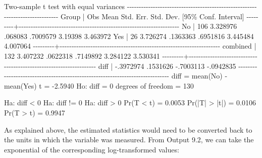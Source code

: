 \documentclass[
]{memoir}
\newenvironment{Shaded}{\begin{snugshade}}{\end{snugshade}}
\newcommand{\NormalTok}[1]{#1}
\begin{document}
\begin{Shaded}
\begin{Highlighting}[]
\NormalTok{Two{-}sample t test with equal variances}
\NormalTok{{-}{-}{-}{-}{-}{-}{-}{-}{-}{-}{-}{-}{-}{-}{-}{-}{-}{-}{-}{-}{-}{-}{-}{-}{-}{-}{-}{-}{-}{-}{-}{-}{-}{-}{-}{-}{-}{-}{-}{-}{-}{-}{-}{-}{-}{-}{-}{-}{-}{-}{-}{-}{-}{-}{-}{-}{-}{-}{-}{-}{-}{-}{-}{-}{-}{-}{-}{-}{-}{-}{-}{-}{-}{-}{-}{-}{-}{-}}
\NormalTok{   Group |     Obs        Mean    Std. Err.   Std. Dev.   [95\% Conf. Interval]}
\NormalTok{{-}{-}{-}{-}{-}{-}{-}{-}{-}+{-}{-}{-}{-}{-}{-}{-}{-}{-}{-}{-}{-}{-}{-}{-}{-}{-}{-}{-}{-}{-}{-}{-}{-}{-}{-}{-}{-}{-}{-}{-}{-}{-}{-}{-}{-}{-}{-}{-}{-}{-}{-}{-}{-}{-}{-}{-}{-}{-}{-}{-}{-}{-}{-}{-}{-}{-}{-}{-}{-}{-}{-}{-}{-}{-}{-}{-}{-}}
\NormalTok{      No |     106    3.328976     .068083    .7009579     3.19398    3.463972}
\NormalTok{     Yes |      26    3.726274    .1363363    .6951816    3.445484    4.007064}
\NormalTok{{-}{-}{-}{-}{-}{-}{-}{-}{-}+{-}{-}{-}{-}{-}{-}{-}{-}{-}{-}{-}{-}{-}{-}{-}{-}{-}{-}{-}{-}{-}{-}{-}{-}{-}{-}{-}{-}{-}{-}{-}{-}{-}{-}{-}{-}{-}{-}{-}{-}{-}{-}{-}{-}{-}{-}{-}{-}{-}{-}{-}{-}{-}{-}{-}{-}{-}{-}{-}{-}{-}{-}{-}{-}{-}{-}{-}{-}}
\NormalTok{combined |     132    3.407232    .0622318    .7149892    3.284122    3.530341}
\NormalTok{{-}{-}{-}{-}{-}{-}{-}{-}{-}+{-}{-}{-}{-}{-}{-}{-}{-}{-}{-}{-}{-}{-}{-}{-}{-}{-}{-}{-}{-}{-}{-}{-}{-}{-}{-}{-}{-}{-}{-}{-}{-}{-}{-}{-}{-}{-}{-}{-}{-}{-}{-}{-}{-}{-}{-}{-}{-}{-}{-}{-}{-}{-}{-}{-}{-}{-}{-}{-}{-}{-}{-}{-}{-}{-}{-}{-}{-}}
\NormalTok{    diff |           {-}.3972974    .1531626               {-}.7003113   {-}.0942835}
\NormalTok{{-}{-}{-}{-}{-}{-}{-}{-}{-}{-}{-}{-}{-}{-}{-}{-}{-}{-}{-}{-}{-}{-}{-}{-}{-}{-}{-}{-}{-}{-}{-}{-}{-}{-}{-}{-}{-}{-}{-}{-}{-}{-}{-}{-}{-}{-}{-}{-}{-}{-}{-}{-}{-}{-}{-}{-}{-}{-}{-}{-}{-}{-}{-}{-}{-}{-}{-}{-}{-}{-}{-}{-}{-}{-}{-}{-}{-}{-}}
\NormalTok{    diff = mean(No) {-} mean(Yes)                                   t =  {-}2.5940}
\NormalTok{Ho: diff = 0                                     degrees of freedom =      130}

\NormalTok{    Ha: diff \textless{} 0                 Ha: diff != 0                 Ha: diff \textgreater{} 0}
\NormalTok{ Pr(T \textless{} t) = 0.0053         Pr(|T| \textgreater{} |t|) = 0.0106          Pr(T \textgreater{} t) = 0.9947}
\end{Highlighting}
\end{Shaded}

As explained above, the estimated statistics would need to be converted back to the units in which the variable was measured. From Output 9.2, we can take the exponential of the corresponding log-transformed values:
\end{document}
